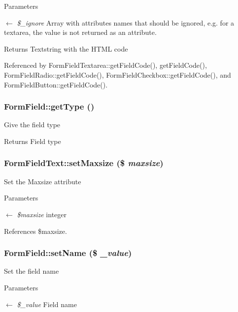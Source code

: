 \begin{DoxyParams}{Parameters}
\item[\mbox{$\leftarrow$} {\em \$\_\-ignore}]Array with attributes names that should be ignored, e.g. for a textarea, the value is not returned as an attribute. \end{DoxyParams}
\begin{DoxyReturn}{Returns}
Textstring with the HTML code 
\end{DoxyReturn}


Referenced by FormFieldTextarea::getFieldCode(), getFieldCode(), FormFieldRadio::getFieldCode(), FormFieldCheckbox::getFieldCode(), and FormFieldButton::getFieldCode().

\subsubsection[{getType}]{\setlength{\rightskip}{0pt plus 5cm}FormField::getType ()}\label{classFormField_a1f64b737bccb6b2827f8c5665b9920c7}
Give the field type \begin{DoxyReturn}{Returns}
Field type 
\end{DoxyReturn}
\subsubsection[{setMaxsize}]{\setlength{\rightskip}{0pt plus 5cm}FormFieldText::setMaxsize (\$ {\em maxsize})}\label{classFormFieldText_a91b6ce8a3476c4296fbe1b0802e70984}
Set the Maxsize attribute 
\begin{DoxyParams}{Parameters}
\item[\mbox{$\leftarrow$} {\em \$maxsize}]integer \end{DoxyParams}


References \$maxsize.

\subsubsection[{setName}]{\setlength{\rightskip}{0pt plus 5cm}FormField::setName (\$ {\em \_\-value})}\label{classFormField_ad57e32bd53170af060e869b3b60f0ef7}
Set the field name 
\begin{DoxyParams}{Parameters}
\item[\mbox{$\leftarrow$} {\em \$\_\-value}]Field name \end{DoxyParams}

